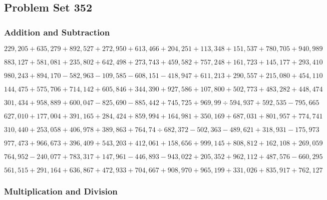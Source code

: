 \hypertarget{problem-set-352}{%
\subsection{Problem Set 352}\label{problem-set-352}}

\hypertarget{addition-and-subtraction}{%
\subsubsection{Addition and
Subtraction}\label{addition-and-subtraction}}

\(229,205+635,279+892,527+272,950+613,466+204,251+113,348+151,537+780,705+940,989\)

\(883,127+581,081+235,802+642,498+273,743+459,582+757,248+161,723+145,177+293,410\)

\(980,243+894,170-582,963-109,585-608,151-418,947+611,213+290,557+215,080+454,110\)

\(144,475+575,706+714,142+605,846+344,390+927,586+107,800+502,773+483,282+448,474\)

\(301,434+958,889+600,047-825,690-885,442+745,725+969,99÷594,937+592,535-795,665\)

\(627,010+177,004+391,165+284,424+859,994+164,981+350,169+687,031+801,957+774,741\)

\(310,440+253,058+406,978+389,863+764,74÷682,372-502,363-489,621+318,931-175,973\)

\(977,473+966,673+396,409+543,203+412,061+158,656+999,145+808,812+162,108+269,059\)

\(764,952-240,077+783,317+147,961-446,893-943,022+205,352+962,112+487,576-660,295\)

\(561,515+291,164+636,867+472,933+704,667+908,970+965,199+331,026+835,917+762,127\)

\hypertarget{multiplication-and-division}{%
\subsubsection{Multiplication and
Division}\label{multiplication-and-division}}

